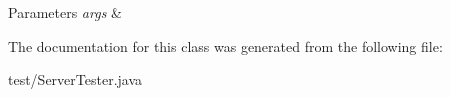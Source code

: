 \begin{DoxyParams}{\-Parameters}
{\em args} & \\
\hline
\end{DoxyParams}


\-The documentation for this class was generated from the following file\-:\begin{DoxyCompactItemize}
\item 
test/\-Server\-Tester.\-java\end{DoxyCompactItemize}
